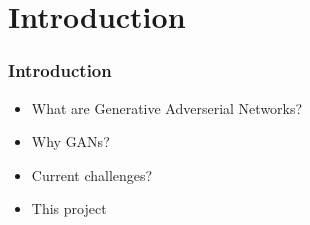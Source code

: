 \section{Introduction}

\begin{frame}
    \frametitle{Introduction}

    \begin{center}
        \begin{itemize}
            \item What are Generative Adverserial Networks?
            \item Why GANs?
            \item Current challenges?
            \item This project
        \end{itemize}
    \end{center}
\end{frame}